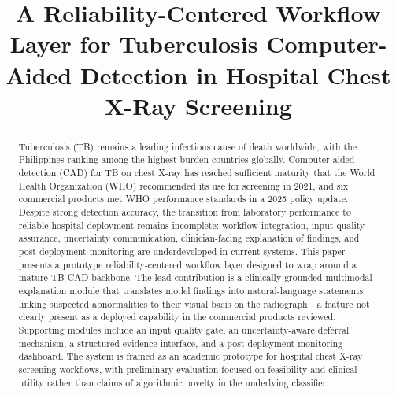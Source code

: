 \documentclass[conference, letterpaper]{IEEEtran}
\begin{document}
\title{A Reliability-Centered Workflow Layer for Tuberculosis Computer-Aided Detection in Hospital Chest X-Ray Screening}

\author{
\and
{}
}

\maketitle

\begin{abstract}
Tuberculosis (TB) remains a leading infectious cause of death worldwide, with the Philippines ranking among the highest-burden countries globally. Computer-aided detection (CAD) for TB on chest X-ray has reached sufficient maturity that the World Health Organization (WHO) recommended its use for screening in 2021, and six commercial products met WHO performance standards in a 2025 policy update. Despite strong detection accuracy, the transition from laboratory performance to reliable hospital deployment remains incomplete: workflow integration, input quality assurance, uncertainty communication, clinician-facing explanation of findings, and post-deployment monitoring are underdeveloped in current systems. This paper presents a prototype reliability-centered workflow layer designed to wrap around a mature TB CAD backbone. The lead contribution is a clinically grounded multimodal explanation module that translates model findings into natural-language statements linking suspected abnormalities to their visual basis on the radiograph---a feature not clearly present as a deployed capability in the commercial products reviewed. Supporting modules include an input quality gate, an uncertainty-aware deferral mechanism, a structured evidence interface, and a post-deployment monitoring dashboard. The system is framed as an academic prototype for hospital chest X-ray screening workflows, with preliminary evaluation focused on feasibility and clinical utility rather than claims of algorithmic novelty in the underlying classifier.
\end{abstract}
\end{document}
